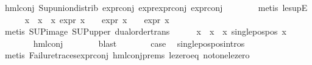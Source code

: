 \begin{isabellebody}
\ hml{\isacharunderscore}{\kern0pt}conj\ Sup{\isacharunderscore}{\kern0pt}union{\isacharunderscore}{\kern0pt}distrib\ expr{\isacharunderscore}{\kern0pt}{}{\isacharunderscore}{\kern0pt}conj\ expr{\isacharunderscore}{\kern0pt}{}{\isachardot}{\kern0pt}expr{\isacharunderscore}{\kern0pt}{}{\isacharunderscore}{\kern0pt}conj\ expr{\isacharunderscore}{\kern0pt}{}{\isacharunderscore}{\kern0pt}conj\isanewline
\ \ \ \ \ \ \isamarkupfalse%
\ {\isacharparenleft}{\kern0pt}metis\ le{\isacharunderscore}{\kern0pt}supE{\isacharparenright}{\kern0pt}{\isacharplus}{\kern0pt}\isanewline
\ \ \ \ \isamarkupfalse%
\ {\isachardoublequoteopen}{\isasymforall}x\ {\isasymin}\ {\isacharparenleft}{\kern0pt}x{}\ {\isacharbackquote}{\kern0pt}\ x{}{\isacharparenright}{\kern0pt}{\isachardot}{\kern0pt}\ expr{\isacharunderscore}{\kern0pt}{}\ x\ {\isasymle}\ {}\ {\isasymand}\ expr{\isacharunderscore}{\kern0pt}{}\ x\ {\isasymle}\ {}\ {\isasymand}\ expr{\isacharunderscore}{\kern0pt}{}\ x\ {\isasymle}\ {}{\isachardoublequoteclose}\isanewline
\ \ \ \ \ \ \isamarkupfalse%
\ {\isacharparenleft}{\kern0pt}metis\ SUP{\isacharunderscore}{\kern0pt}image\ SUP{\isacharunderscore}{\kern0pt}upper\ dual{\isacharunderscore}{\kern0pt}order{\isachardot}{\kern0pt}trans{\isacharparenright}{\kern0pt}\isanewline
\ \ \ \ \isamarkupfalse%
\ {\isachardoublequoteopen}{\isasymforall}x\ {\isasymin}\ {\isacharparenleft}{\kern0pt}x{}\ {\isacharbackquote}{\kern0pt}\ x{}{\isacharparenright}{\kern0pt}{\isachardot}{\kern0pt}\ single{\isacharunderscore}{\kern0pt}pos{\isacharunderscore}{\kern0pt}pos\ x{\isachardoublequoteclose}\isanewline
\ \ \ \ \ \ \isamarkupfalse%
\ hml{\isacharunderscore}{\kern0pt}conj\isanewline
\ \ \ \ \ \ \isamarkupfalse%
\ blast\isanewline
\ \ \ \ \isamarkupfalse%
\ \isamarkupfalse%
\ {\isacharquery}{\kern0pt}case\ \isamarkupfalse%
\ single{\isacharunderscore}{\kern0pt}pos{\isacharunderscore}{\kern0pt}pos{\isachardot}{\kern0pt}intros{\isacharparenleft}{\kern0pt}{}{\isacharparenright}{\kern0pt}\ \isanewline
\ \ \ \ \ \ \isamarkupfalse%
\ {\isacharparenleft}{\kern0pt}metis\ Failure{\isacharunderscore}{\kern0pt}traces{\isachardot}{\kern0pt}expr{\isacharunderscore}{\kern0pt}{}{\isacharunderscore}{\kern0pt}conj\ hml{\isacharunderscore}{\kern0pt}conj{\isachardot}{\kern0pt}prems{\isacharparenleft}{\kern0pt}{}{\isacharparenright}{\kern0pt}\ le{\isacharunderscore}{\kern0pt}zero{\isacharunderscore}{\kern0pt}eq\ not{\isacharunderscore}{\kern0pt}one{\isacharunderscore}{\kern0pt}le{\isacharunderscore}{\kern0pt}zero{\isacharparenright}{\kern0pt}\isanewline

\end{isabellebody}
